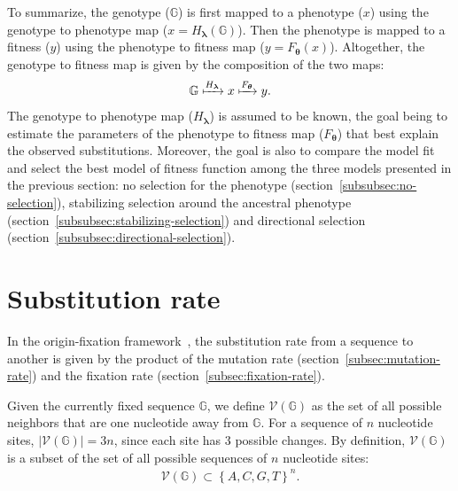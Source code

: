 \documentclass{article}
\newcommand{\NbrSites}{n}
\newcommand{\Geno}{\mathbb{G}}
\newcommand{\setNeighbors}{\mathcal{V}\left(\Geno\right)}
\newcommand{\PhenoDef}{x}
\newcommand{\PhenoParam}{\bm{\lambda}}
\newcommand{\GenoPhenoMap}{H_{\PhenoParam}}
\newcommand{\Pheno}{\GenoPhenoMap\left(\Geno\right)}
\newcommand{\FitParam}{\bm{\theta}}
\newcommand{\PhenoFitMapDef}{F}
\newcommand{\PhenoFitMap}{\PhenoFitMapDef_{\FitParam}}
\newcommand{\FitDef}{y}
\begin{document}
    To summarize, the genotype ($\Geno$) is first mapped to a phenotype ($\PhenoDef$) using the genotype to phenotype map ($ \PhenoDef = \Pheno$).
    Then the phenotype is mapped to a fitness ($\FitDef$) using the phenotype to fitness map ($\FitDef = \PhenoFitMap (\PhenoDef)$).
    Altogether, the genotype to fitness map is given by the composition of the two maps:
    \begin{align}
        \Geno \xmapsto{\GenoPhenoMap} \PhenoDef \xmapsto{\PhenoFitMap} \FitDef.
    \end{align}
    The genotype to phenotype map ($\GenoPhenoMap$) is assumed to be known, the goal being to estimate the parameters of the phenotype to fitness map ($\PhenoFitMap$) that best explain the observed substitutions.
    Moreover, the goal is also to compare the model fit and select the best model of fitness function among the three models presented in the previous section: no selection for the phenotype (section~\ref{subsubsec:no-selection}), stabilizing selection around the ancestral phenotype (section~\ref{subsubsec:stabilizing-selection}) and directional selection (section~\ref{subsubsec:directional-selection}).

    \newpage

    \section{Substitution rate}\label{sec:substitution-rate}

    In the origin-fixation framework~\cite{mccandlish_modeling_2014}, the substitution rate from a sequence to another is given by the product of the mutation rate (section~\ref{subsec:mutation-rate}) and the fixation rate (section~\ref{subsec:fixation-rate}).

    Given the currently fixed sequence $\Geno$, we define $\setNeighbors$ as the set of all possible neighbors that are one nucleotide away from $\Geno$.
    For a sequence of $\NbrSites$ nucleotide sites, $\left| \setNeighbors \right| = 3 \NbrSites$, since each site has $3$ possible changes.
    By definition, $\setNeighbors$ is a subset of the set of all possible sequences of $\NbrSites$ nucleotide sites:
    \begin{align}
        \setNeighbors \subset \left\{ A, C, G, T \right\}^{\NbrSites}.
    \end{align}
\end{document}
